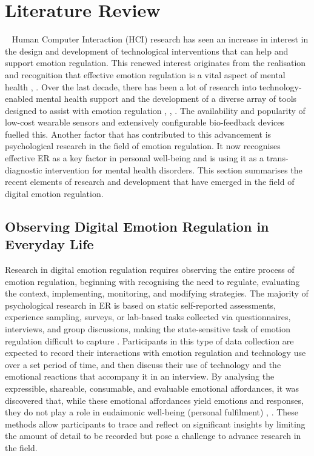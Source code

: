 \newpage 
\section{Literature Review}~\label{sec:literature}
Human Computer Interaction (HCI) research has seen an increase in interest in the design and development of technological interventions that can help and support emotion regulation. This renewed interest originates from the realisation and recognition that effective emotion regulation is a vital aspect of mental health \cite{gross2015emotion}, \cite{davidson1998affective}. Over the last decade, there has been a lot of research into technology-enabled mental health support and the development of a diverse array of tools designed to assist with emotion regulation \cite{wadley2020digital}, \cite{smith2022digital}, \cite{slovak2022designing}. The availability and popularity of low-cost wearable sensors and extensively configurable bio-feedback devices fuelled this. Another factor that has contributed to this advancement is psychological research in the field of emotion regulation. It now recognises effective ER as a key factor in personal well-being and is using it as a trans-diagnostic intervention for mental health disorders. This section summarises the recent elements of research and development that have emerged in the field of digital emotion regulation. 

\subsection{Observing Digital Emotion Regulation in Everyday Life}

Research in digital emotion regulation requires observing the entire process of emotion regulation, beginning with recognising the need to regulate, evaluating the context, implementing, monitoring, and modifying strategies. The majority of psychological research in ER is based on static self-reported assessments, experience sampling, surveys, or lab-based tasks collected via questionnaires, interviews, and group discussions, making the state-sensitive task of emotion regulation difficult to capture \cite{wadley2022future}. Participants in this type of data collection are expected to record their interactions with emotion regulation and technology use over a set period of time, and then discuss their use of technology and the emotional reactions that accompany it in an interview.  By analysing the expressible, shareable, consumable, and evaluable emotional affordances, it was discovered that, while these emotional affordances yield emotions and responses, they do not play a role in eudaimonic well-being (personal fulfilment) \cite{tag2021retrospective}, \cite{steinert2022emotions}. These methods allow participants to trace and reflect on significant insights by limiting the amount of detail to be recorded but pose a challenge to advance research in the field.



